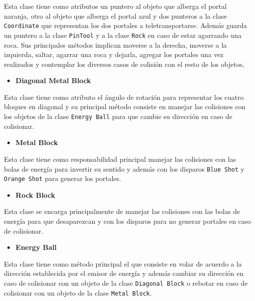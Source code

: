 \documentclass[a4paper]{article}
\begin{document}
Esta clase tiene como atributos un puntero al objeto que alberga el portal naranja, otro al objeto que alberga el portal azul y dos punteros a la clase \texttt{Coordinate} que representan los dos portales a teletransportarse. Además guarda un puntero a la clase \texttt{PinTool} y a la clase \texttt{Rock} en caso de estar agarrando una roca. Sus principales métodos implican moverse a la derecha, moverse a la izquierda, saltar, agarrar una roca y dejarla, agregar los portales una vez realizados y contemplar los diversos casos de colisión con el resto de los objetos,

\begin{itemize}
	\item \textbf{Diagonal Metal Block}
\end{itemize}

Esta clase tiene como atributo el ángulo de rotación para representar los cuatro bloques en diagonal y su principal método consiste en manejar las colisiones con los objetos de la clase \texttt{Energy Ball} para que cambie su dirección en caso de colisionar.

\begin{itemize}
	\item \textbf{Metal Block}
\end{itemize}

Esta clase tiene como responsabilidad principal manejar las colisiones con las bolas de energía para invertir su sentido y además con los disparos \texttt{Blue Shot} y \texttt{Orange Shot} para generar los portales.

\begin{itemize}
	\item \textbf{Rock Block}
\end{itemize}

Esta clase se encarga principalmente de manejar las colisiones con las bolas de energía para que desaparezcan y con los disparos para no generar portales en caso de colisionar.

\begin{itemize}
	\item \textbf{Energy Ball}
\end{itemize}

Esta clase tiene como método principal el que consiste en volar de acuerdo a la dirección establecida por el emisor de energía y además cambiar su dirección en caso de colisionar con un objeto de la clase \texttt{Diagonal Block} o rebotar en caso de colisionar con un objeto de la clase \texttt{Metal Block}.
\end{document}
